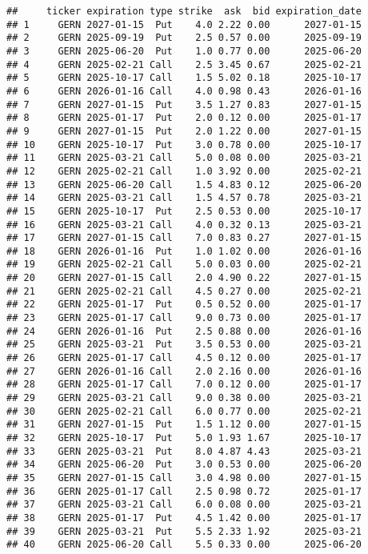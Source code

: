 \documentclass[
]{article}
\begin{document}
\begin{verbatim}
##     ticker expiration type strike  ask  bid expiration_date
## 1     GERN 2027-01-15  Put    4.0 2.22 0.00      2027-01-15
## 2     GERN 2025-09-19  Put    2.5 0.57 0.00      2025-09-19
## 3     GERN 2025-06-20  Put    1.0 0.77 0.00      2025-06-20
## 4     GERN 2025-02-21 Call    2.5 3.45 0.67      2025-02-21
## 5     GERN 2025-10-17 Call    1.5 5.02 0.18      2025-10-17
## 6     GERN 2026-01-16 Call    4.0 0.98 0.43      2026-01-16
## 7     GERN 2027-01-15  Put    3.5 1.27 0.83      2027-01-15
## 8     GERN 2025-01-17  Put    2.0 0.12 0.00      2025-01-17
## 9     GERN 2027-01-15  Put    2.0 1.22 0.00      2027-01-15
## 10    GERN 2025-10-17  Put    3.0 0.78 0.00      2025-10-17
## 11    GERN 2025-03-21 Call    5.0 0.08 0.00      2025-03-21
## 12    GERN 2025-02-21 Call    1.0 3.92 0.00      2025-02-21
## 13    GERN 2025-06-20 Call    1.5 4.83 0.12      2025-06-20
## 14    GERN 2025-03-21 Call    1.5 4.57 0.78      2025-03-21
## 15    GERN 2025-10-17  Put    2.5 0.53 0.00      2025-10-17
## 16    GERN 2025-03-21 Call    4.0 0.32 0.13      2025-03-21
## 17    GERN 2027-01-15 Call    7.0 0.83 0.27      2027-01-15
## 18    GERN 2026-01-16  Put    1.0 1.02 0.00      2026-01-16
## 19    GERN 2025-02-21 Call    5.0 0.03 0.00      2025-02-21
## 20    GERN 2027-01-15 Call    2.0 4.90 0.22      2027-01-15
## 21    GERN 2025-02-21 Call    4.5 0.27 0.00      2025-02-21
## 22    GERN 2025-01-17  Put    0.5 0.52 0.00      2025-01-17
## 23    GERN 2025-01-17 Call    9.0 0.73 0.00      2025-01-17
## 24    GERN 2026-01-16  Put    2.5 0.88 0.00      2026-01-16
## 25    GERN 2025-03-21  Put    3.5 0.53 0.00      2025-03-21
## 26    GERN 2025-01-17 Call    4.5 0.12 0.00      2025-01-17
## 27    GERN 2026-01-16 Call    2.0 2.16 0.00      2026-01-16
## 28    GERN 2025-01-17 Call    7.0 0.12 0.00      2025-01-17
## 29    GERN 2025-03-21 Call    9.0 0.38 0.00      2025-03-21
## 30    GERN 2025-02-21 Call    6.0 0.77 0.00      2025-02-21
## 31    GERN 2027-01-15  Put    1.5 1.12 0.00      2027-01-15
## 32    GERN 2025-10-17  Put    5.0 1.93 1.67      2025-10-17
## 33    GERN 2025-03-21  Put    8.0 4.87 4.43      2025-03-21
## 34    GERN 2025-06-20  Put    3.0 0.53 0.00      2025-06-20
## 35    GERN 2027-01-15 Call    3.0 4.98 0.00      2027-01-15
## 36    GERN 2025-01-17 Call    2.5 0.98 0.72      2025-01-17
## 37    GERN 2025-03-21 Call    6.0 0.08 0.00      2025-03-21
## 38    GERN 2025-01-17  Put    4.5 1.42 0.00      2025-01-17
## 39    GERN 2025-03-21  Put    5.5 2.33 1.92      2025-03-21
## 40    GERN 2025-06-20 Call    5.5 0.33 0.00      2025-06-20

\end{verbatim}
\end{document}
